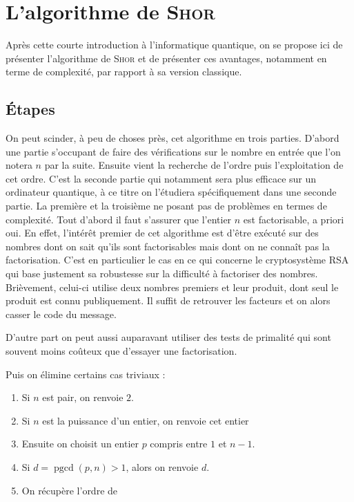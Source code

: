 \documentclass[a4paper,11pt]{tipe}
\DeclareMathOperator{\pgcd}{pgcd}
\begin{document}
\chapter{L'algorithme de \textsc{Shor}}
Après cette courte introduction à l'informatique quantique, on se propose ici
de présenter l'algorithme de \textsc{Shor} et de présenter ces avantages,
notamment en terme de complexité, par rapport à sa version classique.
\section{Étapes}
On peut scinder, à peu de choses près, cet algorithme en trois parties. D'abord
une partie s'occupant de faire des vérifications sur le nombre en entrée que
l'on notera $n$ par la suite. Ensuite vient la recherche de l'ordre puis
l'exploitation de cet ordre. C'est la seconde partie qui notamment sera plus
efficace sur un ordinateur quantique, à ce titre on l'étudiera spécifiquement
dans une seconde partie. La première et la troisième ne posant pas
de problèmes en termes de complexité.
Tout d'abord il faut s'assurer que l'entier $n$ est factorisable, a priori oui.
En effet, l'intérêt premier de cet algorithme est d'être exécuté sur des
nombres dont on sait qu'ils sont factorisables mais dont on ne connaît pas la
factorisation. C'est en particulier le cas en ce qui concerne le cryptosystème
RSA qui base justement sa robustesse sur la difficulté à factoriser des
nombres. Brièvement, celui-ci utilise deux nombres premiers et leur produit,
dont seul le produit est connu publiquement. Il suffit de retrouver les
facteurs et on alors \og casser \fg{} le code du message.

D'autre part on peut aussi auparavant utiliser des tests de primalité qui sont
souvent moins coûteux que d'essayer une factorisation.

Puis on élimine certains cas triviaux :
\begin{enumerate}
 \item Si $n$ est pair, on renvoie $2$.
 \item Si $n$ est la puissance d'un entier, on renvoie cet entier
 \item \label{choix_de_p}Ensuite on choisit un entier $p$ compris entre $1$ et
$n-1$.
 \item Si $d = \pgcd(p,n) > 1$, alors on renvoie $d$.  
 \item On récupère l'ordre de 
\end{enumerate} 
\end{document}
